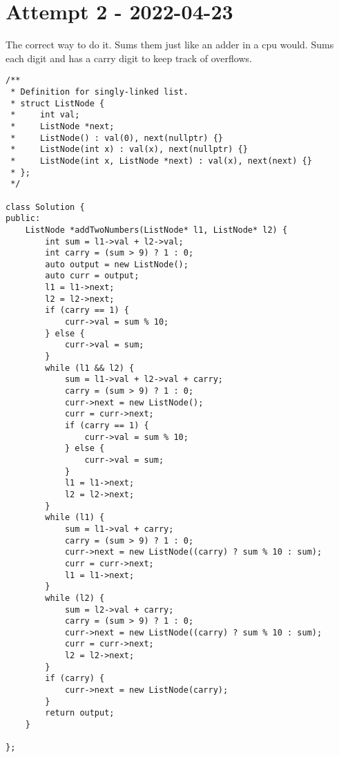 \section{Attempt 2 - 2022-04-23} The correct way to do it. Sums them just like an adder in a cpu would. Sums each digit and has a carry digit to keep track of overflows.
\begin{lstlisting}
/**
 * Definition for singly-linked list.
 * struct ListNode {
 *     int val;
 *     ListNode *next;
 *     ListNode() : val(0), next(nullptr) {}
 *     ListNode(int x) : val(x), next(nullptr) {}
 *     ListNode(int x, ListNode *next) : val(x), next(next) {}
 * };
 */

class Solution {
public:
    ListNode *addTwoNumbers(ListNode* l1, ListNode* l2) {
        int sum = l1->val + l2->val;
        int carry = (sum > 9) ? 1 : 0;
        auto output = new ListNode();
        auto curr = output;
        l1 = l1->next;
        l2 = l2->next;
        if (carry == 1) {
            curr->val = sum % 10;
        } else {
            curr->val = sum;
        }
        while (l1 && l2) {
            sum = l1->val + l2->val + carry;
            carry = (sum > 9) ? 1 : 0;
            curr->next = new ListNode();
            curr = curr->next;
            if (carry == 1) {
                curr->val = sum % 10;
            } else {
                curr->val = sum;
            }
            l1 = l1->next;
            l2 = l2->next;
        }
        while (l1) {
            sum = l1->val + carry;
            carry = (sum > 9) ? 1 : 0;
            curr->next = new ListNode((carry) ? sum % 10 : sum);
            curr = curr->next;
            l1 = l1->next;
        }
        while (l2) {
            sum = l2->val + carry;
            carry = (sum > 9) ? 1 : 0;
            curr->next = new ListNode((carry) ? sum % 10 : sum);
            curr = curr->next;
            l2 = l2->next;
        }
        if (carry) {
            curr->next = new ListNode(carry);
        }
        return output;
    }
   
};
\end{lstlisting}
